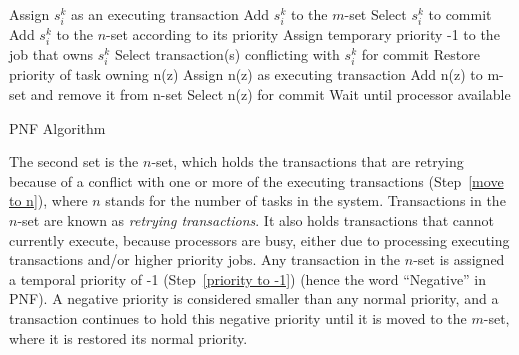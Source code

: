 \documentclass[twocolumn]{article}
\begin{document}
\begin{algorithm}[h]
\footnotesize{
\LinesNumbered
{}
{
Assign $s_i^k$ as an executing transaction\;
Add $s_i^k$ to the $m$-set\;
Select $s_i^k$ to commit
}
{
Add $s_i^k$ to the $n$-set according to its priority\label{move to n}\;
Assign temporary priority -1 to the job that owns $s_i^k$ \label{priority to -1}\;
Select transaction(s) conflicting with $s_i^k$ for commit\label{s_i^k commit}\;
}
{
	{
		{
			{
				Restore priority of task owning n(z)\;
				Assign n(z) as executing transaction\;
				Add n(z) to m-set and remove it from n-set\;
				Select n(z) for commit\;
			}
			{
				Wait until processor available
			}
		}
	}
}
}
\caption{PNF Algorithm} \label{PNF-algorithm}
\end{algorithm}


The second set is the $n$-set, which holds the transactions
that are retrying because of a conflict with one or more of the executing
transactions (Step~\ref{move to n}), where $n$ stands for
the number of tasks in the system. Transactions in the $n$-set are known as \emph{retrying transactions}. It also holds transactions that
cannot currently execute, because processors are busy, either due to processing executing transactions
and/or higher priority jobs. Any transaction in the $n$-set is assigned a temporal
priority of -1 (Step~\ref{priority to -1}) (hence the word 
``Negative'' in PNF). A negative priority
is considered smaller than any normal priority, and a transaction
continues to hold this negative priority until it is moved to the $m$-set, where it is restored its normal priority.
\end{document}
